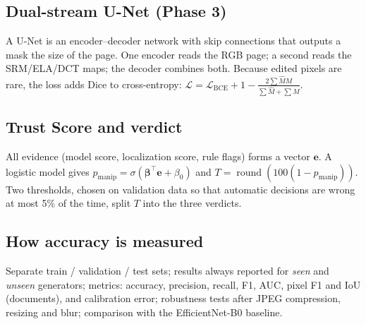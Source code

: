 \documentclass[11pt,a4paper]{article}
\begin{document}
\subsection*{Dual-stream U-Net (Phase 3)}
A U-Net is an encoder--decoder network with skip connections that outputs a mask the size of the
page. One encoder reads the RGB page; a second reads the SRM/ELA/DCT maps; the decoder combines both.
Because edited pixels are rare, the loss adds Dice to cross-entropy:
$\mathcal{L}=\mathcal{L}_{\text{BCE}}+1-\frac{2\sum\hat M M}{\sum\hat M+\sum M}$.

\subsection*{Trust Score and verdict}
All evidence (model score, localization score, rule flags) forms a vector $\mathbf{e}$.
A logistic model gives $p_{\text{manip}}=\sigma(\boldsymbol\beta^{\top}\mathbf{e}+\beta_0)$ and
$T=\operatorname{round}(100(1-p_{\text{manip}}))$. Two thresholds, chosen on validation data so that
automatic decisions are wrong at most 5\% of the time, split $T$ into the three verdicts.

\subsection*{How accuracy is measured}
Separate train / validation / test sets; results always reported for \emph{seen} and \emph{unseen}
generators; metrics: accuracy, precision, recall, F1, AUC, pixel F1 and IoU (documents), and
calibration error; robustness tests after JPEG compression, resizing and blur; comparison with the
EfficientNet-B0 baseline.

\vspace{1em}
\end{document}
